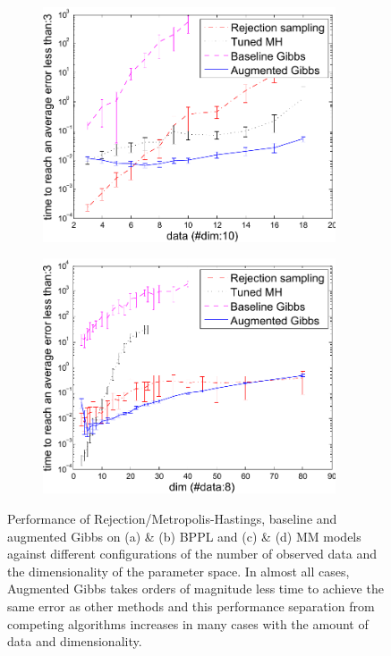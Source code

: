 \begin{figure}[thb!]
%
\centering
\begin{subfigure}{.49\textwidth}
  \centering
  \includegraphics[width=0.95\textwidth]{plot/mmm_data_analysis2.pdf}
  \caption{}
  \label{fig:mmm_data_analysis}
\end{subfigure}
\begin{subfigure}{.49\textwidth}
  \centering
  \hspace{5mm} \includegraphics[width=0.95\textwidth]{plot/mmm_dim_analysis10.pdf}
  \caption{}
  \label{fig:mmm_dim_analysis}
\end{subfigure}
\caption{Performance of Rejection/Metropolis-Hastings, baseline and augmented Gibbs on (a) \& (b) BPPL and (c) \& (d) MM models against different configurations of the number of observed data and the dimensionality of the parameter space.  In almost all cases, Augmented Gibbs takes orders of magnitude less time to achieve the same error as other methods and this performance separation from competing algorithms increases in many cases with the amount of data and dimensionality.}
\label{fig:results}
\end{figure}

